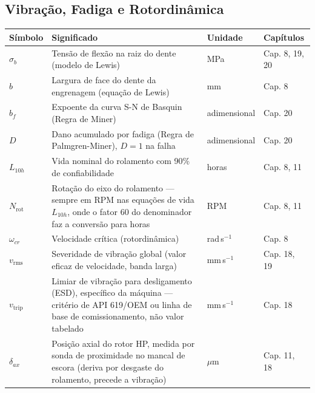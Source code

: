 \documentclass[12pt,a4paper]{article}
\numberwithin{equation}{section}
\numberwithin{table}{section}
\numberwithin{figure}{section}
\begin{document}
{{\subsection*{Vibração, Fadiga e Rotordinâmica}
\begin{longtable}{>{\raggedright\arraybackslash}p{2.8cm} >{\raggedright\arraybackslash}p{5.3cm} >{\raggedright\arraybackslash}p{2.1cm} >{\raggedright\arraybackslash}p{4.2cm}}
	\toprule
	\textbf{Símbolo} & \textbf{Significado} & \textbf{Unidade} & \textbf{Capítulos} \\ \midrule
	\endhead
	$\sigma_b$ & Tensão de flexão na raiz do dente (modelo de Lewis) & MPa & Cap. 8, 19, 20 \\
	$b$ & Largura de face do dente da engrenagem (equação de Lewis) & mm & Cap. 8 \\
	$b_f$\dag & Expoente da curva S-N de Basquin (Regra de Miner) & adimensional & Cap. 20 \\
	$D$ & Dano acumulado por fadiga (Regra de Palmgren-Miner), $D=1$ na falha & adimensional & Cap. 20 \\
	$L_{10h}$ & Vida nominal do rolamento com 90\% de confiabilidade & horas & Cap. 8, 11 \\
	$N_{\text{rot}}$\dag & Rotação do eixo do rolamento — sempre em RPM nas equações de vida $L_{10h}$, onde o fator 60 do denominador faz a conversão para horas & RPM & Cap. 8, 11 \\
	$\omega_{cr}$ & Velocidade crítica (rotordinâmica) & rad\,s$^{-1}$ & Cap. 8 \\
	$v_{\text{rms}}$ & Severidade de vibração global (valor eficaz de velocidade, banda larga) & mm\,s$^{-1}$ & Cap. 18, 19 \\
	$v_{\text{trip}}$ & Limiar de vibração para desligamento (ESD), específico da máquina — critério de API 619/OEM ou linha de base de comissionamento, não valor tabelado & mm\,s$^{-1}$ & Cap. 18 \\
	$\delta_{ax}$ & Posição axial do rotor HP, medida por sonda de proximidade no mancal de escora (deriva por desgaste do rolamento, precede a vibração) & $\mu$m & Cap. 11, 18 \\ \bottomrule
\end{longtable}

}}
\end{document}
